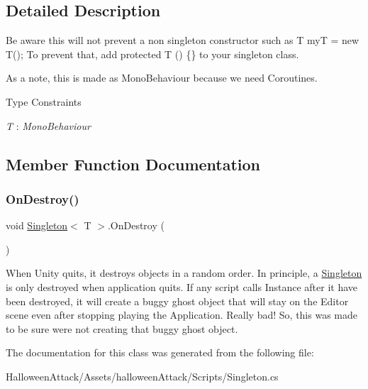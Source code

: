 \subsection{Detailed Description}
Be aware this will not prevent a non singleton constructor such as {\ttfamily T myT = new T();} To prevent that, add {\ttfamily protected T () \{\}} to your singleton class. 

As a note, this is made as Mono\+Behaviour because we need Coroutines. \begin{Desc}
\item[Type Constraints]\begin{description}
\item[{\em T} : {\em Mono\+Behaviour}]\end{description}
\end{Desc}


\subsection{Member Function Documentation}
\mbox{\label{class_singleton_a81a4ea792b927aeae3f52c1e0d2036af}} 
\subsubsection{\texorpdfstring{On\+Destroy()}{OnDestroy()}}
{\footnotesize\ttfamily void \hyperlink{class_singleton}{Singleton}$<$ T $>$.On\+Destroy (\begin{DoxyParamCaption}{ }\end{DoxyParamCaption})}



When Unity quits, it destroys objects in a random order. In principle, a \hyperlink{class_singleton}{Singleton} is only destroyed when application quits. If any script calls Instance after it have been destroyed, it will create a buggy ghost object that will stay on the Editor scene even after stopping playing the Application. Really bad! So, this was made to be sure we\textquotesingle{}re not creating that buggy ghost object. 



The documentation for this class was generated from the following file\+:\begin{DoxyCompactItemize}
\item 
Halloween\+Attack/\+Assets/halloween\+Attack/\+Scripts/Singleton.\+cs\end{DoxyCompactItemize}
